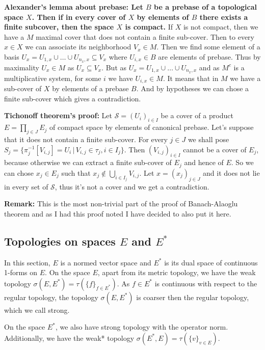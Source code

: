 \documentclass{article}
\begin{document}
\textbf{Alexander's lemma about prebase: Let $B$ be a prebase of a topological
space $X$. Then if in every cover of $X$ by elements of $B$ there exists a finite
subcover, then the space $X$ is compact.} If $X$ is not compact, then we have
a $M$ maximal cover that does not contain a finite sub-cover. Then to every
$x\in X$ we can associate its neighborhood $V_x\in M$. Then we find some
element of a basis $U_x=U_{1,x}\cup\ldots\cup U_{n_x,x}\subseteq V_x$ where
$U_{i,x}\in B$ are elements of prebase. Thus by maximality $U_x\in M$ as
$U_x\subseteq V_x$. But as $U_x=U_{1,x}\cup\ldots\cup U_{n_x,x}$ and as $M^c$
is a multiplicative system, for some $i$ we have $U_{i,x}\in M$. It means that
in $M$ we have a sub-cover of $X$ by elements of a prebase $B$. And by hypotheses
we can chose a finite sub-cover which gives a contradiction.
\vspace{1ex}

\textbf{Tichonoff theorem's proof:} Let $\mathcal{S}=(U_i)_{i\in I}$ be a cover of a
product $E=\prod_{j\in J} E_j$ of compact space by elements of canonical prebase.
Let's suppose that it does not contain a finite sub-cover. For every $j\in J$
we shall pose $S_j=\{\pi_j^{-1}[V_{i,j}]=U_i\,|\,V_{i,j}\in\tau_j,i\in I_j\}$.
Then $(V_{i,j})_{i\in I}$ cannot be a cover of $E_j$, because otherwise we can
extract a finite sub-cover of $E_j$ and hence of $E$. So we can chose $x_j\in
E_j$ such that $x_j\notin\bigcup_{i\in I_j}V_{i,j}$. Let $x=(x_j)_{j\in J}$ and
it does not lie in every set of $\mathcal{S}$, thus it's not a cover and we get
a contradiction.

\vspace{1ex}
\textbf{Remark:} This is the most non-trivial part of the proof of Banach-Alaoglu
theorem and as I had this proof noted I have decided to also put it here.

\subsection{Topologies on spaces $E$ and $E^*$}
In this section, $E$ is a normed vector space and $E^*$ is its dual space of continuous
1-forms on $E$. On the space $E$, apart from its metric topology, we have
the weak topology $\sigma(E, E^*)=\tau(\{f\}_{f\in E^*})$. As $f\in E^*$ is
continuous with respect to the regular topology, the topology $\sigma(E, E^*)$
is coarser then the regular topology, which we call strong.
\vspace{1ex}

On the space $E^*$, we also have strong topology with the operator norm.
Additionally, we have the weak* topology $\sigma(E^*, E)=\tau(\{v\}_{v\in E})$.
\end{document}
